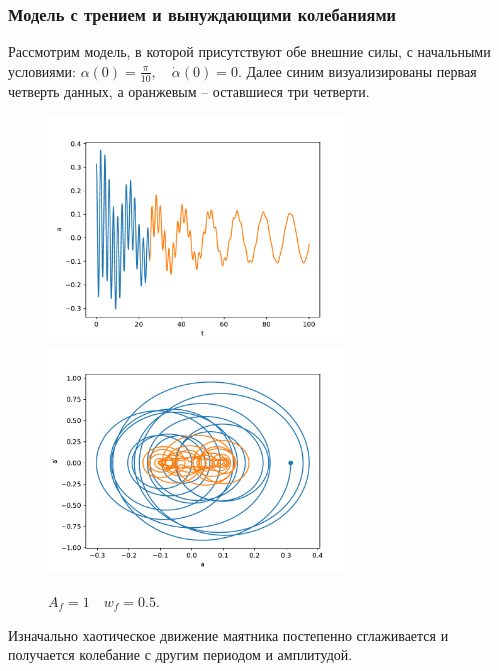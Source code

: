         \subsubsection{Модель с трением и вынуждающими колебаниями}
            Рассмотрим модель, в которой присутствуют обе внешние силы, с начальными условиями: $\alpha(0) = \frac{\pi}{10}, \quad \dot{\alpha}(0) = 0$. Далее синим визуализированы первая четверть данных, а оранжевым -- оставшиеся три четверти.
            \begin{figure}[H]
                \centering
                \includegraphics[width=8cm]{pictures/5resonance1.pdf}
                \includegraphics[width=8cm]{pictures/5resonance1p.pdf}
                \caption{$A_f = 1 \quad w_f = 0.5$.}
            \end{figure}
            Изначально хаотическое движение маятника постепенно сглаживается и получается колебание с другим периодом и амплитудой.

